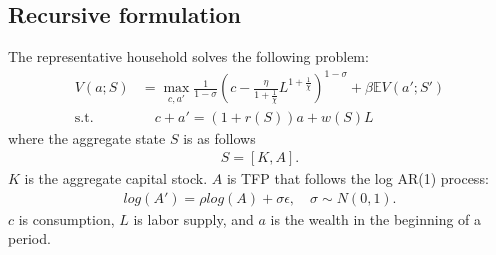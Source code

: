 \subsection*{Recursive formulation}
The representative household solves the following problem:
\begin{align*}
  V(a;S) &= \max_{c,a'} \frac{1}{1-\sigma}\left(c-
  \frac{\eta}{1+\frac{1}{\chi}}L^{1+\frac{1}{\chi}}\right)^{1-\sigma} + \beta \mathbb{E}V(a';S')
  \\
  \text{s.t. }& \quad
  c+a' = (1+r(S))a + w(S)L
\end{align*}
where the aggregate state $S$ is as follows
\begin{align*}
  S = [K,A].
\end{align*}
$K$ is the aggregate capital stock. $A$ is TFP that follows the log AR(1) process:
\begin{align*}
  log(A') = \rho log(A) + \sigma\epsilon,\quad\sigma\sim N(0,1).
\end{align*}
$c$ is consumption, $L$ is labor supply, and $a$ is the wealth in the beginning of a period. %

